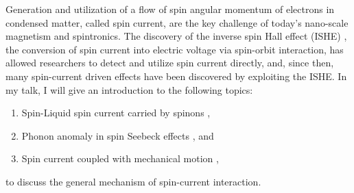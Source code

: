 Generation and utilization of a flow of spin angular momentum of electrons in condensed matter, called spin current, are the key challenge of today's nano-scale magnetism and spintronics. The discovery of the inverse spin Hall effect (ISHE) \cite{Saitoh_2006}, the conversion of spin current into electric voltage via spin-orbit interaction, has allowed researchers to detect and utilize spin current directly, and, since then, many spin-current driven effects have been discovered by exploiting the ISHE. In my talk, I will give an introduction to the following topics: \begin{enumerate} \item Spin-Liquid spin current carried by spinons \cite{Hirobe_2016}, \item Phonon anomaly in spin Seebeck effects \cite{Kikkawa_2016}, and \item Spin current coupled with mechanical motion \cite{Takahashi_2015},\end{enumerate} to discuss the general mechanism of spin-current interaction.